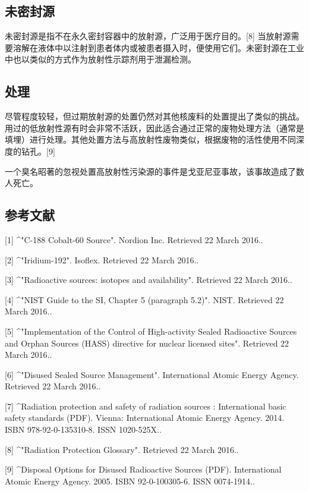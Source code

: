 \subsection{未密封源}
未密封源是指不在永久密封容器中的放射源，广泛用于医疗目的。[8] 当放射源需要溶解在液体中以注射到患者体内或被患者摄入时，便使用它们。未密封源在工业中也以类似的方式作为放射性示踪剂用于泄漏检测。

\subsection{处理}
尽管程度较轻，但过期放射源的处置仍然对其他核废料的处置提出了类似的挑战。用过的低放射性源有时会非常不活跃，因此适合通过正常的废物处理方法（通常是填埋）进行处理。其他处置方法与高放射性废物类似，根据废物的活性使用不同深度的钻孔。[9]

一个臭名昭著的忽视处置高放射性污染源的事件是戈亚尼亚事故，该事故造成了数人死亡。

\subsection{参考文献}
[1]
^"C-188 Cobalt-60 Source". Nordion Inc. Retrieved 22 March 2016..

[2]
^"Iridium-192". Isoflex. Retrieved 22 March 2016..

[3]
^"Radioactive sources: isotopes and availability". Retrieved 22 March 2016..

[4]
^"NIST Guide to the SI, Chapter 5 (paragraph 5.2)". NIST. Retrieved 22 March 2016..

[5]
^"Implementation of the Control of High-activity Sealed Radioactive Sources and Orphan Sources (HASS) directive for nuclear licensed sites". Retrieved 22 March 2016..

[6]
^"Disused Sealed Source Management". International Atomic Energy Agency. Retrieved 22 March 2016..

[7]
^Radiation protection and safety of radiation sources : International basic safety standards (PDF). Vienna: International Atomic Energy Agency. 2014. ISBN 978-92-0-135310-8. ISSN 1020-525X..

[8]
^"Radiation Protection Glossary". Retrieved 22 March 2016..

[9]
^Disposal Options for Disused Radioactive Sources (PDF). International Atomic Energy Agency. 2005. ISBN 92-0-100305-6. ISSN 0074-1914..